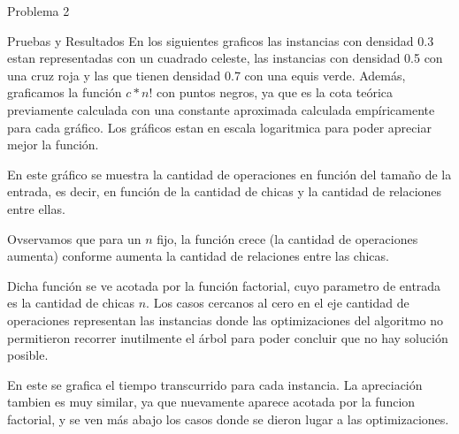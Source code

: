 \begin{section}{Problema 2}
\begin{subsection}{Pruebas y Resultados}
		En los siguientes graficos las instancias con densidad 0.3 estan representadas con un cuadrado celeste, las instancias con densidad 0.5 con una cruz roja y las que tienen densidad 0.7 con una equis verde. Además, graficamos la función $c*n!$ con puntos negros, ya que es la cota teórica previamente calculada con una constante aproximada calculada empíricamente para cada gráfico.
		Los gráficos estan en escala logaritmica para poder apreciar mejor la función.\VSP
		
		\newpage

		\VSP

		En este gráfico se muestra la cantidad de operaciones en función del tamaño de la entrada, es decir, en función de la cantidad de chicas y la cantidad de relaciones entre ellas.

		Ovservamos que para un $n$ fijo, la función crece (la cantidad de operaciones aumenta) conforme aumenta la cantidad de relaciones entre las chicas.

		Dicha función se ve acotada por la función factorial, cuyo parametro de entrada es la cantidad de chicas $n$. Los casos cercanos al cero en el eje cantidad de operaciones representan las instancias donde las optimizaciones del algoritmo no permitieron recorrer inutilmente el árbol para poder concluir que no hay solución posible.\VSP

		\newpage

		\VSP

		En este se grafica el tiempo transcurrido para cada instancia. La apreciación tambien es muy similar, ya que nuevamente aparece acotada por la funcion factorial, y se ven más abajo los casos donde se dieron lugar a las optimizaciones.
	\end{subsection}
\end{section}

